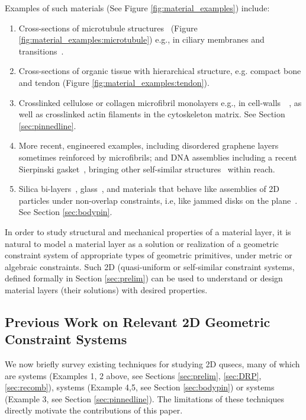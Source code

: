 Examples of such materials (See Figure \ref{fig:material_examples})
include:
%
\begin{enumerate}
    \item \label{materialexample1} Cross-sections of microtubule structures~\cite{microtubule_necklace} (Figure \ref{fig:material_examples:microtubule}) e.g., in ciliary membranes and transitions~\cite{microtubule_cilia}.

    \item \label{materialexample2} Cross-sections of organic tissue with hierarchical structure, e.g. compact bone and tendon (Figure \ref{fig:material_examples:tendon}).

    \item \label{materialexample3} Crosslinked cellulose or collagen microfibril monolayers e.g., in cell-walls~\cite{wikimediacommons2010afm}~\cite{wikimediacommons2007plant}, as well as crosslinked actin filaments in the cytoskeleton matrix. See Section \ref{sec:pinnedline}.

    \item \label{materialexample4} More recent, engineered examples, including disordered
    graphene layers~\cite{Graphene1}~\cite{Graphene2} sometimes
    reinforced by microfibrils; and DNA assemblies including a recent
    Sierpinski gasket~\cite{self_assembly_sierpinski}, bringing other
    self-similar structures~\cite{wikimediacommons2012subdivision} within reach.

    \item \label{materialexample5} Silica bi-layers~\cite{silica_bilayers}, glass~\cite{sructure_of_2d_glass}, and
    materials that behave like assemblies of 2D particles under
    non-overlap constraints, i.e, like jammed disks on the plane~\cite{jammed_disks}. See Section \ref{sec:bodypin}.
\end{enumerate}
%
In order to study structural and mechanical properties
of a material layer, it is natural to model a material layer as a solution or
realization of a geometric constraint system of appropriate types of geometric
primitives, under metric or algebraic constraints. Such 2D
 (quasi-uniform or self-similar constraint systems, defined
formally in Section \ref{sec:prelim}) can be
used to understand or design material layers (their solutions) with
desired properties.
%
\subsection{Previous Work on Relevant 2D Geometric Constraint Systems}
We now briefly survey existing techniques for studying 2D
qusecs,  many of which are  systems
(Examples 1, 2 above, see Sections \ref{sec:prelim}, \ref{sec:DRP}, \ref{sec:recomb}),
 systems (Example 4,5, see Section
\ref{sec:bodypin}) or  systems (Example
3, see Section \ref{sec:pinnedline}). The limitations of these
techniques directly motivate the contributions of this paper.

